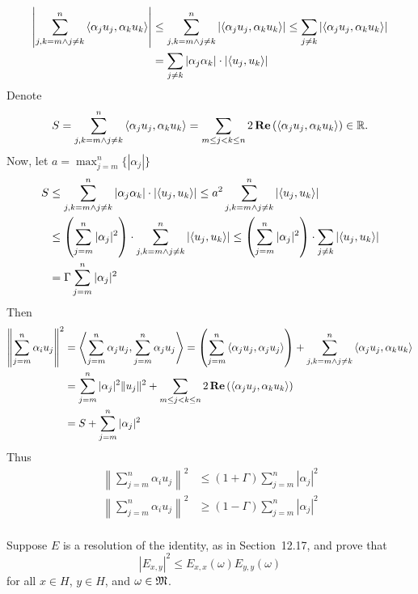 \begin{enumerate}
\begin{align*}
\left|\sum_{j,k=m \wedge j\neq k}^n \left\langle \alpha_j u_j, \alpha_k u_k \right\rangle \right|
 &\leq \sum_{j,k=m \wedge j\neq k}^n
   \left|\left\langle \alpha_j u_j, \alpha_k u_k \right\rangle\right| 
  \leq \sum_{j\neq k} \left|\left\langle \alpha_j u_j, \alpha_k u_k \right\rangle\right| \\
 &= \sum_{j\neq k} |\alpha_j \alpha_k|\cdot\left|\left\langle u_j, u_k \right\rangle\right|
\end{align*}
\fi
Denote
\begin{equation*}
S = \sum_{j,k=m \wedge j\neq k}^n \left\langle \alpha_j u_j, \alpha_k u_k \right\rangle
  = \sum_{m\leq j<k\leq n} 2\mathop{\bf Re}\nolimits\left(\left\langle \alpha_j u_j, \alpha_k u_k \right\rangle\right)
  \in \mathbb{R}.
\end{equation*}
Now, let \(a=\max_{j=m}^n\{|\alpha_j|\}\)
\begin{align*}
S
  &\leq \sum_{j,k=m \wedge j\neq k}^n |\alpha_j \alpha_k|\cdot
    \left|\left\langle u_j, u_k \right\rangle\right|
  \leq a^2 \sum_{j,k=m \wedge j\neq k}^n \left|\left\langle u_j, u_k \right\rangle\right| \\
  &\leq  \left(\sum_{j=m}^n |\alpha_j|^2\right)\cdot
        \sum_{j,k=m \wedge j\neq k}^n \left|\left\langle u_j, u_k \right\rangle\right|
  \leq  \left(\sum_{j=m}^n |\alpha_j|^2\right)\cdot
        \sum_{j\neq k} \left|\left\langle u_j, u_k \right\rangle\right| \\
  &= \Gamma \sum_{j=m}^n |\alpha_j|^2
\end{align*}
Then
\begin{align*}
\left\| \sum_{j=m}^n \alpha_i u_j \right\|^2
 &= \left\langle \sum_{j=m}^n \alpha_j u_j, \sum_{j=m}^n \alpha_j u_j \right\rangle
 = \left(\sum_{j=m}^n \left\langle \alpha_j u_j, \alpha_j u_j \right\rangle\right)
   + \sum_{j,k=m \wedge j\neq k}^n \left\langle \alpha_j u_j, \alpha_k u_k \right\rangle \\
 &= \sum_{j=m}^n |\alpha_j|^2\|u_j\|^2
    + \sum_{m\leq j<k\leq n}
      2\mathop{\bf Re}\nolimits\left(\left\langle \alpha_j u_j, \alpha_k u_k \right\rangle\right) \\
 &= S + \sum_{j=m}^n |\alpha_j|^2
\end{align*}
Thus
\begin{align*}
\left\| \sum_{j=m}^n \alpha_i u_j \right\|^2
  &\leq (1+\Gamma)\sum_{j=m}^n |\alpha_j|^2 \\ 
\left\| \sum_{j=m}^n \alpha_i u_j \right\|^2
  &\geq (1-\Gamma)\sum_{j=m}^n |\alpha_j|^2 \\ 
\end{align*}

\unfinished

\begin{excopy}
Suppose $E$ is a resolution of the identity, as in Section~12.17, and prove that
\begin{equation*}
\left|E_{x,y}\right|^2 \leq E_{x,x}(\omega) E_{y,y}(\omega)
\end{equation*}
for all \(x\in H\), \(y\in H\), and \(\omega \in \mathfrak{M}\).
\end{excopy}
\unfinished

\begin{excopy}
\end{excopy}


\end{enumerate}


